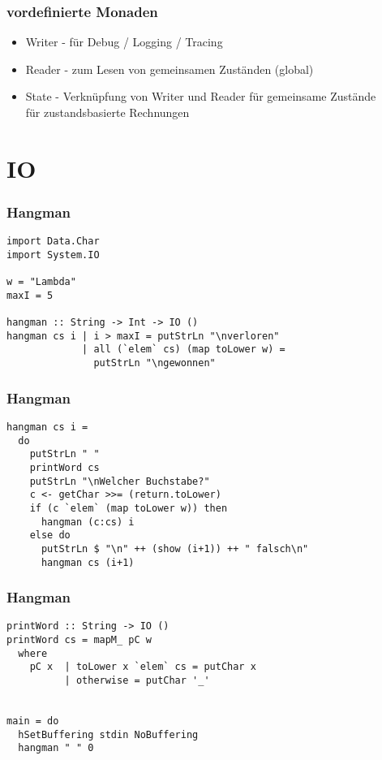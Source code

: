 \begin{frame}
\frametitle{vordefinierte Monaden}
\begin{itemize}
\item Writer - für Debug / Logging / Tracing
\item Reader - zum Lesen von gemeinsamen Zuständen (global)
\item State - Verknüpfung von Writer und Reader für gemeinsame Zustände
\\ für zustandsbasierte Rechnungen
\end{itemize}
\end{frame}

\section{IO}

\begin{frame}[fragile]
\frametitle{Hangman}
\begin{lstlisting}
import Data.Char
import System.IO

w = "Lambda"
maxI = 5

hangman :: String -> Int -> IO ()
hangman cs i | i > maxI = putStrLn "\nverloren"
             | all (`elem` cs) (map toLower w) = 
               putStrLn "\ngewonnen"
\end{lstlisting}	
\end{frame}

\begin{frame}[fragile]
\frametitle{Hangman}
\begin{lstlisting}
hangman cs i = 
  do
    putStrLn " "
    printWord cs
    putStrLn "\nWelcher Buchstabe?"
    c <- getChar >>= (return.toLower)
    if (c `elem` (map toLower w)) then
      hangman (c:cs) i 
    else do
      putStrLn $ "\n" ++ (show (i+1)) ++ " falsch\n"
      hangman cs (i+1)
\end{lstlisting}	
\end{frame}

\begin{frame}[fragile]
\frametitle{Hangman}
\begin{lstlisting}
printWord :: String -> IO ()
printWord cs = mapM_ pC w 
  where
    pC x  | toLower x `elem` cs = putChar x
          | otherwise = putChar '_'

          
main = do
  hSetBuffering stdin NoBuffering
  hangman " " 0
\end{lstlisting}	
\end{frame}

